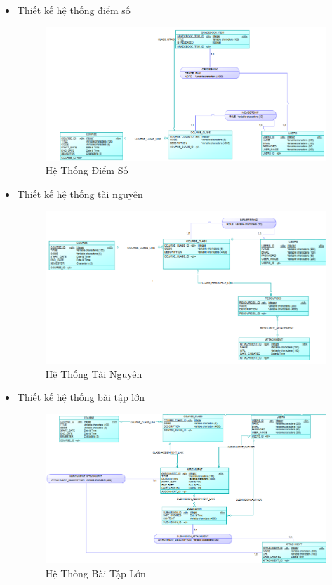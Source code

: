 \documentclass[12pt]{article}
\begin{document}
\begin{itemize}
\item Thiết kế hệ thống điểm số
\begin{figure}[H]
\centering
\includegraphics[scale = 0.9]{score.png}
\caption{Hệ Thống Điểm Số}
\end{figure}

\newpage

\item Thiết kế hệ thống tài nguyên
\begin{figure}[H]
\centering
\includegraphics[scale = 0.9]{resource.png}
\caption{Hệ Thống Tài Nguyên}
\end{figure}

\item Thiết kế hệ thống bài tập lớn
\begin{figure}[H]
\centering
\includegraphics[scale = 0.9]{Assignment.png}
\caption{Hệ Thống Bài Tập Lớn}
\end{figure}

\end{itemize}
\end{document}
